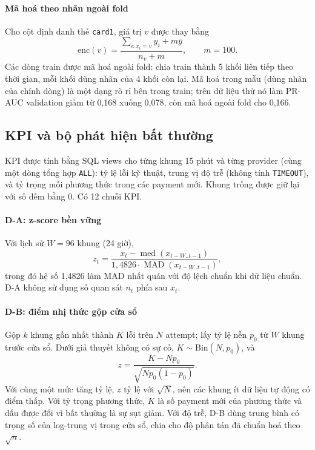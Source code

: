 \documentclass[11pt,a4paper]{article}
\theoremstyle{definition}
\theoremstyle{remark}
\newcommand{\code}[1]{\texttt{#1}}
\numberwithin{equation}{section}
\begin{document}
\paragraph{Mã hoá theo nhãn ngoài fold} Cho cột định danh thẻ \code{card1}, giá trị $v$ được thay bằng
\begin{equation}
\text{enc}(v)=\frac{\sum_{i:x_i=v}y_i+m\bar y}{n_v+m},\qquad m=100.
\end{equation}
Các dòng train được mã hoá ngoài fold: chia train thành 5 khối liên tiếp theo thời gian, mỗi khối dùng nhãn của 4 khối còn lại. Mã hoá trong mẫu (dùng nhãn của chính dòng) là một dạng rò rỉ bên trong train; trên dữ liệu thử nó làm PR-AUC validation giảm từ 0,168 xuống 0,078, còn mã hoá ngoài fold cho 0,166.

\subsection{KPI và bộ phát hiện bất thường}\label{sec:detectors}
KPI được tính bằng SQL views cho từng khung 15 phút và từng provider (cùng một dòng tổng hợp \code{ALL}): tỷ lệ lỗi kỹ thuật, trung vị độ trễ (không tính \code{TIMEOUT}), và tỷ trọng mỗi phương thức trong các payment mới. Khung trống được giữ lại với số đếm bằng 0. Có 12 chuỗi KPI.

\paragraph{D-A: z-score bền vững} Với lịch sử $W=96$ khung (24 giờ),
\begin{equation}
z_t=\frac{x_t-\operatorname{med}(x_{t-W..t-1})}{1{,}4826\cdot\operatorname{MAD}(x_{t-W..t-1})},
\end{equation}
trong đó hệ số 1,4826 làm MAD nhất quán với độ lệch chuẩn khi dữ liệu chuẩn. D-A không sử dụng số quan sát $n_t$ phía sau $x_t$.

\paragraph{D-B: điểm nhị thức gộp cửa sổ} Gộp $k$ khung gần nhất thành $K$ lỗi trên $N$ attempt; lấy tỷ lệ nền $p_0$ từ $W$ khung trước cửa sổ. Dưới giả thuyết không có sự cố, $K\sim\mathrm{Bin}(N,p_0)$, và
\begin{equation}\label{eq:binz}
z=\frac{K-Np_0}{\sqrt{Np_0(1-p_0)}}.
\end{equation}
Với cùng một mức tăng tỷ lệ, $z$ tỷ lệ với $\sqrt N$, nên các khung ít dữ liệu tự động có điểm thấp. Với tỷ trọng phương thức, $K$ là số payment mới của phương thức và dấu được đổi vì bất thường là sự sụt giảm. Với độ trễ, D-B dùng trung bình có trọng số của log-trung vị trong cửa sổ, chia cho độ phân tán đã chuẩn hoá theo $\sqrt n$.
\end{document}
